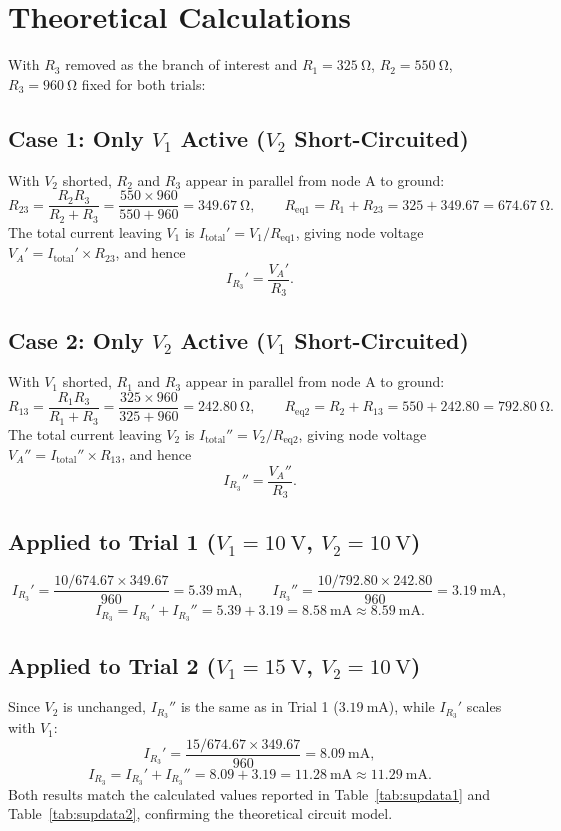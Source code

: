 \section{Theoretical Calculations}
With $R_3$ removed as the branch of interest and $R_1=\qty{325}{\ohm}$, $R_2=\qty{550}{\ohm}$, $R_3=\qty{960}{\ohm}$ fixed for both trials:

\subsection*{Case 1: Only $V_1$ Active ($V_2$ Short-Circuited)}
With $V_2$ shorted, $R_2$ and $R_3$ appear in parallel from node A to ground:
\[
R_{23} = \frac{R_2 R_3}{R_2+R_3} = \frac{550\times960}{550+960} = \qty{349.67}{\ohm}, \qquad
R_{\text{eq1}} = R_1+R_{23} = 325+349.67 = \qty{674.67}{\ohm}.
\]
The total current leaving $V_1$ is $I_{\text{total}}' = V_1/R_{\text{eq1}}$, giving node voltage $V_A' = I_{\text{total}}' \times R_{23}$, and hence
\[
I_{R_3}' = \frac{V_A'}{R_3}.
\]

\subsection*{Case 2: Only $V_2$ Active ($V_1$ Short-Circuited)}
With $V_1$ shorted, $R_1$ and $R_3$ appear in parallel from node A to ground:
\[
R_{13} = \frac{R_1 R_3}{R_1+R_3} = \frac{325\times960}{325+960} = \qty{242.80}{\ohm}, \qquad
R_{\text{eq2}} = R_2+R_{13} = 550+242.80 = \qty{792.80}{\ohm}.
\]
The total current leaving $V_2$ is $I_{\text{total}}'' = V_2/R_{\text{eq2}}$, giving node voltage $V_A'' = I_{\text{total}}'' \times R_{13}$, and hence
\[
I_{R_3}'' = \frac{V_A''}{R_3}.
\]

\subsection*{Applied to Trial 1 ($V_1=\qty{10}{\volt}$, $V_2=\qty{10}{\volt}$)}
\[
I_{R_3}' = \frac{10/674.67 \times 349.67}{960} = \qty{5.39}{\milli\ampere}, \qquad
I_{R_3}'' = \frac{10/792.80 \times 242.80}{960} = \qty{3.19}{\milli\ampere},
\]
\[
I_{R_3} = I_{R_3}' + I_{R_3}'' = 5.39+3.19 = \qty{8.58}{\milli\ampere} \approx \qty{8.59}{\milli\ampere}.
\]

\subsection*{Applied to Trial 2 ($V_1=\qty{15}{\volt}$, $V_2=\qty{10}{\volt}$)}
Since $V_2$ is unchanged, $I_{R_3}''$ is the same as in Trial 1 ($\qty{3.19}{\milli\ampere}$), while $I_{R_3}'$ scales with $V_1$:
\[
I_{R_3}' = \frac{15/674.67 \times 349.67}{960} = \qty{8.09}{\milli\ampere},
\]
\[
I_{R_3} = I_{R_3}' + I_{R_3}'' = 8.09+3.19 = \qty{11.28}{\milli\ampere} \approx \qty{11.29}{\milli\ampere}.
\]
Both results match the calculated values reported in Table~\ref{tab:supdata1} and Table~\ref{tab:supdata2}, confirming the theoretical circuit model.

